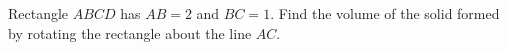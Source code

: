 Rectangle \(ABCD\) has \(AB=2\) and \(BC=1\). Find the volume of the solid formed by rotating the rectangle about the line \(AC\).
